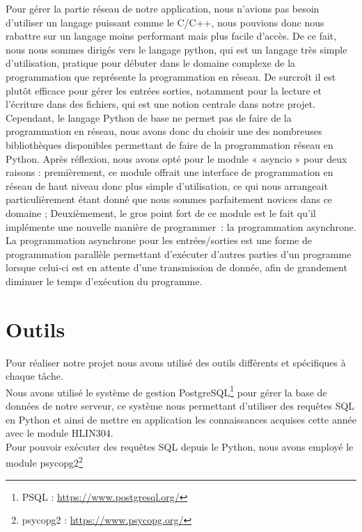 \documentclass[twoside]{report}
\begin{document}
Pour gérer la partie réseau de notre application, nous n'avions pas besoin d'utiliser un langage puissant comme le C/C++, nous pouvions donc nous rabattre sur un langage moins performant mais plus facile d'accès.
De ce fait, nous nous sommes dirigés vers le langage python, qui est un langage très simple d'utilisation, pratique pour débuter dans le domaine complexe de la programmation que représente la programmation en réseau. De surcroît il est plutôt efficace pour gérer les entrées sorties, notamment pour la lecture et l'écriture dans des fichiers, qui est une notion centrale dans notre projet.\\
Cependant, le langage Python de base ne permet pas de faire de la programmation en réseau, nous avons donc du choisir une des nombreuses bibliothèques disponibles permettant de faire de la programmation réseau en Python. \label{asyncio} Après réflexion, nous avons opté pour le module « asyncio » pour deux raisons : premièrement, ce module offrait une interface de programmation en réseau de haut niveau donc plus simple d'utilisation, ce qui nous arrangeait particulièrement étant donné que nous sommes parfaitement novices dans ce domaine ; Deuxièmement, le gros point fort de ce module est le fait qu'il implémente une nouvelle manière de programmer~: la programmation asynchrone. La programmation asynchrone pour les entrées/sorties est une forme de programmation parallèle permettant d'exécuter d'autres parties d'un programme lorsque celui-ci est en attente d'une transmission de donnée, afin de grandement diminuer le temps d'exécution du programme. \\

\section{Outils} %
Pour réaliser notre projet nous avons utilisé des outils différents et spécifiques à chaque tâche. \\

Nous avons utilisé le système de gestion PostgreSQL\footnote{PSQL : \url{https://www.postgresql.org/}} pour gérer la base de données de notre serveur, ce système nous permettant d'utiliser des requêtes SQL en Python et ainsi de mettre en application les connaissances acquises cette année avec le module HLIN304. \\
Pour pouvoir exécuter des requêtes SQL depuis le Python, nous avons employé le module psycopg2\footnote{psycopg2 : \url{https://www.psycopg.org/}} \\
\end{document}
